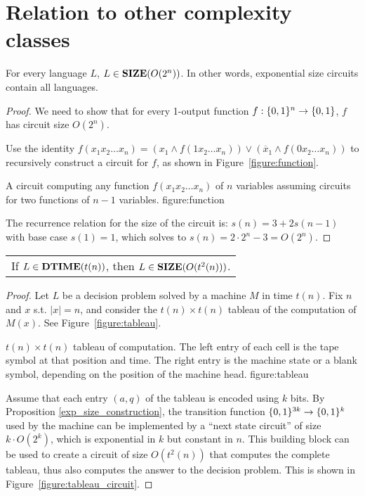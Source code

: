 \section{Relation to other complexity classes} \label{section:relation}

\begin{Prop} \label{exp_size_construction}
For every language $L$, $L \in \size(O(2^n))$. In other words, exponential size circuits contain all languages.
\end{Prop}

\begin{proof}
We need to show that for every 1-output function $f:\{0,1\}^n \to \{0,1\}$, $f$ has circuit size $O(2^n)$.

Use the identity $f(x_1 x_2 \ldots x_n) = (x_1 \land f(1 x_2 \ldots x_n)) \lor (\overline{x}_1 \land f(0 x_2 \ldots x_n))$ to recursively construct a circuit for $f$, as shown in Figure~\ref{figure:function}.

{A circuit computing any function $f(x_1 x_2 \ldots x_n)$ of $n$ 
variables assuming circuits for two functions of $n-1$ variables.}
{figure:function}


The recurrence relation for the size of the circuit is: $s(n) = 3 + 2s(n-1)$ with base case $s(1) = 1$, which solves to $s(n) = 2 \cdot 2^n - 3 = O(2^n)$.
\end{proof}

\begin{Prop}
\begin{tabular}{l}
If $L \in \mbox{\bf DTIME}(t(n))$, then $L \in \size(O(t^2(n)))$.
\end{tabular}
\end{Prop}

\begin{proof}
Let $L$ be a decision problem solved by a machine $M$ in time $t(n)$. Fix $n$ and $x$ s.t. $|x| = n$, and consider the $t(n) \times t(n)$ tableau of the computation of $M(x)$. See Figure~\ref{figure:tableau}.

{$t(n) \times t(n)$ tableau of computation. The left entry of each cell is the tape symbol at that position and time. The right entry is the machine state or a blank symbol, depending on the position of the machine head.}
{figure:tableau}


Assume that each entry $(a,q)$ of the tableau is encoded using $k$ bits. By Proposition \ref{exp_size_construction}, the transition function $\{0,1\}^{3k} \to \{0,1\}^k$ used by the machine can be implemented by a ``next state circuit'' of size $k \cdot O(2^k)$, which is exponential in $k$ but constant in $n$. This building block can be used to create a circuit of size $O(t^2(n))$ that computes the complete tableau, thus also computes the answer to the decision problem. This is shown in Figure~\ref{figure:tableau_circuit}.
\end{proof}

